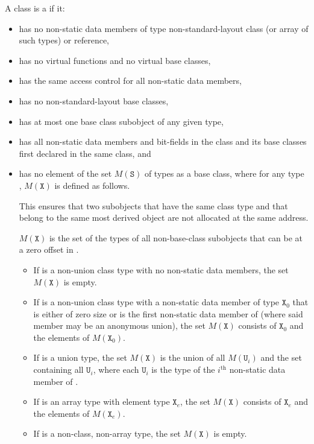 \pnum
A class  is a  if it:
\begin{itemize}
\item has no non-static data members of type non-standard-layout class
(or array of such types) or reference,

\item has no virtual functions and no
virtual base classes,

\item has the same access control
for all non-static data members,

\item has no non-standard-layout base classes,

\item has at most one base class subobject of any given type,

\item has all non-static data members and bit-fields in the class and
its base classes first declared in the same class, and

\item has no element of the set $M(\mathtt{S})$ of types
as a base class,
where for any type , $M(\mathtt{X})$ is defined as follows.
\begin{footnote}

This ensures that two subobjects that have the same class type and that
belong to the same most derived object are not allocated at the same
address.
\end{footnote}
\begin{note}
$M(\mathtt{X})$ is the set of the types of all non-base-class subobjects
that can be at a zero offset in .
\end{note}

\begin{itemize}
\item If  is a non-union class type with no non-static data members,
the set $M(\mathtt{X})$ is empty.

\item If  is a non-union class type with a non-static data
member of type $\mathtt{X}_0$
that is either of zero size or
is the first non-static data member of 
(where said member may be an anonymous union),
the set $M(\mathtt{X})$ consists of $\mathtt{X}_0$ and the elements of
$M(\mathtt{X}_0)$.

\item If  is a union type, the set $M(\mathtt{X})$ is
the union of all $M(\mathtt{U}_i)$ and the set containing all $\mathtt{U}_i$,
where each $\mathtt{U}_i$ is the type of the $i^\text{th}$ non-static data member
of .

\item If  is an array type with element type $\mathtt{X}_e$,
the set $M(\mathtt{X})$ consists of $\mathtt{X}_e$
and the elements of $M(\mathtt{X}_e)$.

\item If  is a non-class, non-array type, the set $M(\mathtt{X})$ is empty.
\end{itemize}
\end{itemize}

